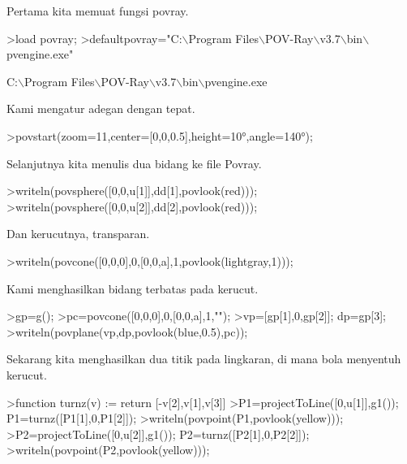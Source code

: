 \documentclass{article}
\begin{document}
\begin{eulernotebook}
\begin{eulercomment}
\begin{eulercomment}
\begin{eulercomment}
\begin{eulercomment}
\begin{eulercomment}
Pertama kita memuat fungsi povray.
\end{eulercomment}
\begin{eulerprompt}
>load povray;
>defaultpovray="C:\(\backslash\)Program Files\(\backslash\)POV-Ray\(\backslash\)v3.7\(\backslash\)bin\(\backslash\)pvengine.exe"
\end{eulerprompt}
\begin{euleroutput}
  C:\(\backslash\)Program Files\(\backslash\)POV-Ray\(\backslash\)v3.7\(\backslash\)bin\(\backslash\)pvengine.exe
\end{euleroutput}
\begin{eulercomment}
Kami mengatur adegan dengan tepat.
\end{eulercomment}
\begin{eulerprompt}
>povstart(zoom=11,center=[0,0,0.5],height=10°,angle=140°);
\end{eulerprompt}
\begin{eulercomment}
Selanjutnya kita menulis dua bidang ke file Povray.
\end{eulercomment}
\begin{eulerprompt}
>writeln(povsphere([0,0,u[1]],dd[1],povlook(red)));
>writeln(povsphere([0,0,u[2]],dd[2],povlook(red)));
\end{eulerprompt}
\begin{eulercomment}
Dan kerucutnya, transparan.
\end{eulercomment}
\begin{eulerprompt}
>writeln(povcone([0,0,0],0,[0,0,a],1,povlook(lightgray,1)));
\end{eulerprompt}
\begin{eulercomment}
Kami menghasilkan bidang terbatas pada kerucut.
\end{eulercomment}
\begin{eulerprompt}
>gp=g();
>pc=povcone([0,0,0],0,[0,0,a],1,"");
>vp=[gp[1],0,gp[2]]; dp=gp[3];
>writeln(povplane(vp,dp,povlook(blue,0.5),pc));
\end{eulerprompt}
\begin{eulercomment}
Sekarang kita menghasilkan dua titik pada lingkaran, di mana bola
menyentuh kerucut.
\end{eulercomment}
\begin{eulerprompt}
>function turnz(v) := return [-v[2],v[1],v[3]]
>P1=projectToLine([0,u[1]],g1()); P1=turnz([P1[1],0,P1[2]]);
>writeln(povpoint(P1,povlook(yellow)));
>P2=projectToLine([0,u[2]],g1()); P2=turnz([P2[1],0,P2[2]]);
>writeln(povpoint(P2,povlook(yellow)));
\end{eulerprompt}

\end{eulercomment}
\end{eulercomment}
\end{eulercomment}
\end{eulercomment}
\end{eulernotebook}
\end{document}
